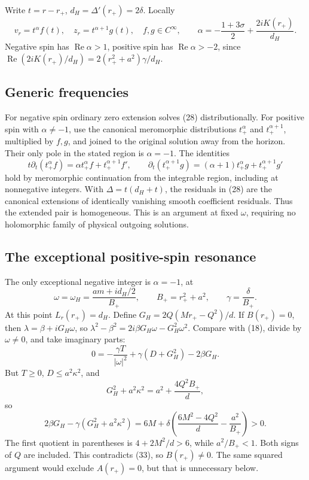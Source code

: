 \documentclass[
  10pt,
  a4paper,
]{article}
\begin{document}
Write \(t=r-r_+\), \(d_H=\Delta'(r_+)=2\delta\). Locally \[
 v_r=t^\alpha f(t),\quad z_r=t^{\alpha+1}g(t),\quad f,g\in C^\infty,
 \qquad
 \alpha=-\frac{1+3\sigma}{2}+\frac{2iK(r_+)}{d_H}.
 \tag{30}
\] Negative spin has \(\operatorname{Re}\alpha>1\), positive spin has
\(\operatorname{Re}\alpha>-2\), since
\(\operatorname{Re}(2iK(r_+)/d_H)=2(r_+^2+a^2)\gamma/d_H\).

\subsection{Generic frequencies}\label{generic-frequencies}

For negative spin ordinary zero extension solves (28) distributionally.
For positive spin with \(\alpha\ne-1\), use the canonical meromorphic
distributions \(t_+^\alpha\) and \(t_+^{\alpha+1}\), multiplied by
\(f,g\), and joined to the original solution away from the horizon.
Their only pole in the stated region is \(\alpha=-1\). The identities \[
 t\partial_t(t_+^\alpha f)
 =\alpha t_+^\alpha f+t_+^{\alpha+1}f',\qquad
 \partial_t(t_+^{\alpha+1}g)
 =(\alpha+1)t_+^\alpha g+t_+^{\alpha+1}g'
 \tag{31}
\] hold by meromorphic continuation from the integrable region,
including at nonnegative integers. With \(\Delta=t(d_H+t)\), the
residuals in (28) are the canonical extensions of identically vanishing
smooth coefficient residuals. Thus the extended pair is homogeneous.
This is an argument at fixed \(\omega\), requiring no holomorphic family
of physical outgoing solutions.

\subsection{The exceptional positive-spin
resonance}\label{the-exceptional-positive-spin-resonance}

The only exceptional negative integer is \(\alpha=-1\), at \[
 \omega=\omega_H=\frac{am+id_H/2}{B_+},\qquad
 B_+=r_+^2+a^2,\qquad \gamma=\frac{\delta}{B_+}.
 \tag{32}
\] At this point \(L_r(r_+)=d_H\). Define \(G_H=2Q(Mr_+-Q^2)/d\). If
\(B(r_+)=0\), then \(\lambda=\beta+iG_H\omega\), so
\(\lambda^2-\beta^2=2i\beta G_H\omega-G_H^2\omega^2\). Compare with
(18), divide by \(\omega\ne0\), and take imaginary parts: \[
 0=-\frac{\gamma T}{|\omega|^2}
       +\gamma(D+G_H^2)-2\beta G_H .
 \tag{33}
\] But \(T\ge0\), \(D\le a^2\kappa^2\), and \[
 G_H^2+a^2\kappa^2=a^2+\frac{4Q^2B_+}{d},
\] so \[
 2\beta G_H-\gamma(G_H^2+a^2\kappa^2)
 =6M+\delta\left(\frac{6M^2-4Q^2}{d}-\frac{a^2}{B_+}\right)>0.
 \tag{34}
\] The first quotient in parentheses is \(4+2M^2/d>6\), while
\(a^2/B_+<1\). Both signs of \(Q\) are included. This contradicts (33),
so \(B(r_+)\ne0\). The same squared argument would exclude \(A(r_+)=0\),
but that is unnecessary below.
\end{document}
